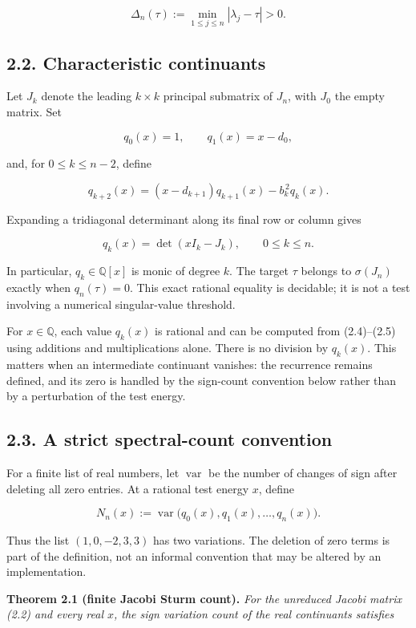\documentclass[
  11pt,
]{article}
\begin{document}
\[
\Delta_n(\tau):=\min_{1\le j\le n}|\lambda_j-\tau|>0.
\tag{2.3}
\]

\subsection{2.2. Characteristic
continuants}\label{characteristic-continuants}

Let \(J_k\) denote the leading \(k\times k\) principal submatrix of
\(J_n\), with \(J_0\) the empty matrix. Set

\[
q_0(x)=1,\qquad q_1(x)=x-d_0,
\tag{2.4}
\]

and, for \(0\le k\le n-2\), define

\[
q_{k+2}(x)
=(x-d_{k+1})q_{k+1}(x)-b_k^{\,2}q_k(x).
\tag{2.5}
\]

Expanding a tridiagonal determinant along its final row or column gives

\[
q_k(x)=\det(xI_k-J_k),\qquad 0\le k\le n.
\tag{2.6}
\]

In particular, \(q_k\in\mathbb Q[x]\) is monic of degree \(k\). The
target \(\tau\) belongs to \(\sigma(J_n)\) exactly when \(q_n(\tau)=0\).
This exact rational equality is decidable; it is not a test involving a
numerical singular-value threshold.

For \(x\in\mathbb Q\), each value \(q_k(x)\) is rational and can be
computed from (2.4)--(2.5) using additions and multiplications alone.
There is no division by \(q_k(x)\). This matters when an intermediate
continuant vanishes: the recurrence remains defined, and its zero is
handled by the sign-count convention below rather than by a perturbation
of the test energy.

\subsection{2.3. A strict spectral-count
convention}\label{a-strict-spectral-count-convention}

For a finite list of real numbers, let \(\operatorname{var}\) be the
number of changes of sign after deleting all zero entries. At a rational
test energy \(x\), define

\[
N_n(x):=
\operatorname{var}\bigl(q_0(x),q_1(x),\ldots,q_n(x)\bigr).
\tag{2.7}
\]

Thus the list \((1,0,-2,3,3)\) has two variations. The deletion of zero
terms is part of the definition, not an informal convention that may be
altered by an implementation.

\textbf{Theorem 2.1 (finite Jacobi Sturm count).} \emph{For the
unreduced Jacobi matrix (2.2) and every real \(x\), the sign variation
count of the real continuants satisfies}
\end{document}
